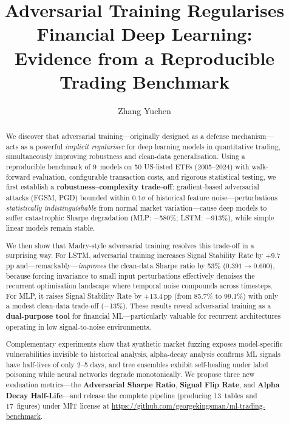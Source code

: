 \documentclass[preprint,review,12pt]{elsarticle}
\begin{document}
\begin{frontmatter}

\title{Adversarial Training Regularises Financial Deep Learning:\\
Evidence from a Reproducible Trading Benchmark}

\author[hku]{Zhang Yuchen}

\address[hku]{AI, Ethics and Society Programme, Faculty of Arts,
  The University of Hong Kong, Hong Kong SAR, China}

\begin{abstract}
We discover that adversarial training---originally designed as a defense mechanism---acts as a powerful \emph{implicit regulariser} for deep learning models in quantitative trading, simultaneously improving robustness and clean-data generalisation.
Using a reproducible benchmark of 9~models on 50 US-listed ETFs (2005--2024) with walk-forward evaluation, configurable transaction costs, and rigorous statistical testing, we first establish a \textbf{robustness--complexity trade-off}: gradient-based adversarial attacks (FGSM, PGD) bounded within $0.1\sigma$ of historical feature noise---perturbations \emph{statistically indistinguishable} from normal market variation---cause deep models to suffer catastrophic Sharpe degradation (MLP: $-$580\%; LSTM: $-$913\%), while simple linear models remain stable.

We then show that Madry-style adversarial training resolves this trade-off in a surprising way.
For LSTM, adversarial training increases Signal Stability Rate by $+9.7$\,pp and---remarkably---\emph{improves} the clean-data Sharpe ratio by 53\% ($0.391 \to 0.600$), because forcing invariance to small input perturbations effectively denoises the recurrent optimisation landscape where temporal noise compounds across timesteps.
For MLP, it raises Signal Stability Rate by $+13.4$\,pp (from 85.7\% to 99.1\%) with only a modest clean-data trade-off ($-$13\%).
These results reveal adversarial training as a \textbf{dual-purpose tool} for financial ML---particularly valuable for recurrent architectures operating in low signal-to-noise environments.

Complementary experiments show that synthetic market fuzzing exposes model-specific vulnerabilities invisible to historical analysis, alpha-decay analysis confirms ML signals have half-lives of only 2--5 days, and tree ensembles exhibit self-healing under label poisoning while neural networks degrade monotonically.
We propose three new evaluation metrics---the \textbf{Adversarial Sharpe Ratio}, \textbf{Signal Flip Rate}, and \textbf{Alpha Decay Half-Life}---and release the complete pipeline (producing 13~tables and 17~figures) under MIT license at \url{https://github.com/georgekingsman/ml-trading-benchmark}.
\end{abstract}


\end{frontmatter}
\end{document}
